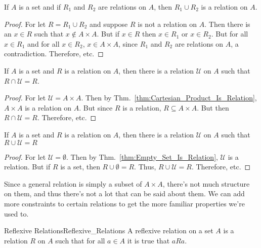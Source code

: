     \begin{theorem}
        \label{thm:Set_Theory_Union_of_Relations_Is_Relation}
        If $A$ is a set and if $R_{1}$ and $R_{2}$ are relations
        on $A$, then $R_{1}\cup{R}_{2}$ is a relation on $A$.
    \end{theorem}
    \begin{proof}
        For let $R=R_{1}\cup{R}_{2}$ and suppose $R$ is not a
        relation on $A$. Then there is an $x\in{R}$ such that
        $x\notin{A}\times{A}$. But if $x\in{R}$ then
        $x\in{R}_{1}$ or $x\in{R}_{2}$. But for all $x\in{R}_{1}$
        and for all $x\in{R}_{2}$,
        $x\in{A}\times{A}$, since $R_{1}$ and $R_{2}$ are
        relations on $A$, a contradiction. Therefore, etc.
    \end{proof}
    \begin{theorem}
        If $A$ is a set and $R$ is a relation on $A$, then there
        is a relation $\mathcal{U}$ on $A$ such that
        $R\cap\mathcal{U}=R$.
    \end{theorem}
    \begin{proof}
        For let $\mathcal{U}={A}\times{A}$. Then by
        Thm.~\ref{thm:Cartesian_Product_Is_Relation}, $A\times{A}$ is
        a relation on $A$. But since $R$ is a relation,
        $R\subseteq{A}\times{A}$. But then
        $R\cap\mathcal{U}=R$. Therefore, etc.
    \end{proof}
    \begin{theorem}
        If $A$ is a set and $R$ is a relation on $A$, then there
        is a relation $\mathcal{U}$ on $A$ such that
        $R\cup\mathcal{U}=R$
    \end{theorem}
    \begin{proof}
        For let $\mathcal{U}=\emptyset$. Then by
        Thm.~\ref{thm:Empty_Set_Is_Relation},
        $\mathcal{U}$ is a relation. But if $R$ is a set, then
        $R\cup\emptyset=R$. Thus, $R\cup\mathcal{U}=R$.
        Therefore, etc.
    \end{proof}
    Since a general relation is simply a subset of $A\times{A}$,
    there's not much structure on them, and thus there's not a lot
    that can be said about them. We can add more constraints to
    certain relations to get the more familiar properties
    we're used to.
    \begin{fdefinition}{Reflexive Relations}{Reflexive_Relations}
        A reflexive relation on a set $A$ is a
        relation $R$ on $A$ such that for all $a\in{A}$
        it is true that $aRa$.
    \end{fdefinition}
